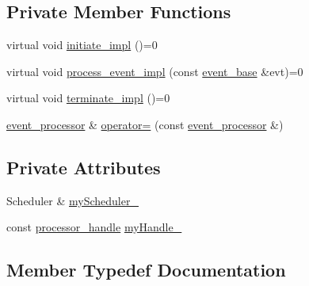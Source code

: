 \subsection*{Private Member Functions}
\begin{DoxyCompactItemize}
\item 
virtual void \mbox{\hyperlink{classboost_1_1statechart_1_1event__processor_a48a2bfcad66582f6c88e6034b2b838cb}{initiate\+\_\+impl}} ()=0
\item 
virtual void \mbox{\hyperlink{classboost_1_1statechart_1_1event__processor_a5db03beb4d6c1545e7bb9584cd60b500}{process\+\_\+event\+\_\+impl}} (const \mbox{\hyperlink{classboost_1_1statechart_1_1event__base}{event\+\_\+base}} \&evt)=0
\item 
virtual void \mbox{\hyperlink{classboost_1_1statechart_1_1event__processor_a3f5f4c757909fca5f389b485a789c24e}{terminate\+\_\+impl}} ()=0
\item 
\mbox{\hyperlink{classboost_1_1statechart_1_1event__processor}{event\+\_\+processor}} \& \mbox{\hyperlink{classboost_1_1statechart_1_1event__processor_af25f0f18781032f24b251c1108132f39}{operator=}} (const \mbox{\hyperlink{classboost_1_1statechart_1_1event__processor}{event\+\_\+processor}} \&)
\end{DoxyCompactItemize}
\subsection*{Private Attributes}
\begin{DoxyCompactItemize}
\item 
Scheduler \& \mbox{\hyperlink{classboost_1_1statechart_1_1event__processor_ac79038b02ceb3fe8acef2a5ce62d4c02}{my\+Scheduler\+\_\+}}
\item 
const \mbox{\hyperlink{classboost_1_1statechart_1_1event__processor_a0cb7488f303c3c79a6bd52b58ce43a2a}{processor\+\_\+handle}} \mbox{\hyperlink{classboost_1_1statechart_1_1event__processor_a97d7bf7f1f4c1fcfec7982ede809d9c4}{my\+Handle\+\_\+}}
\end{DoxyCompactItemize}


\subsection{Member Typedef Documentation}
\mbox{\label{classboost_1_1statechart_1_1event__processor_a99f1c6ec8419ec82f140c5c93c5eb8cd}} 
